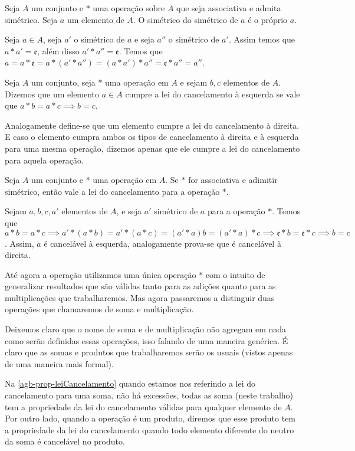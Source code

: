 \documentclass[../main.tex]{subfiles}
\begin{document}
\begin{prop}\label{agb-prop-simetricoSimetrico}
    Seja $A$ um conjunto e $*$ uma operação sobre $A$ que seja associativa e admita simétrico. Seja $a$ um elemento de $A$. O simétrico do simétrico de $a$ é o próprio $a$. 
\end{prop}
\begin{dem}
    Seja $a \in A$, seja $a'$ o simétrico de $a$ e seja $a''$ o simétrico de $a'$. Assim temos que $a * a' = \mathfrak{e}$, além disso $a' * a'' = \mathfrak{e}$.
    Temos que $a = a * \mathfrak{e} = a * (a' * a'') = (a * a') * a'' = \mathfrak{e} * a'' = a''$.
\end{dem}
\begin{defi}
    Seja $A$ um conjunto, seja $*$ uma operação em $A$ e sejam $b,c$ elementos de $A$. Dizemos que um elemento $a \in A$ cumpre a lei do cancelamento à esquerda se vale que $a*b=a*c \implies b=c$.
\end{defi}
    Analogamente define-se que um elemento cumpre a lei do cancelamento à direita. E caso o elemento cumpra ambos os tipos de cancelamento à direita e à esquerda para uma mesma operação, dizemos apenas que ele cumpre a lei do cancelamento para aquela operação.
\begin{prop}\label{agb-prop-leiCancelamento}
    Seja $A$ um conjunto e $*$ uma operação em $A$. Se $*$ for associativa e adimitir simétrico, então vale a lei do cancelamento para a operação $*$.
\end{prop}
\begin{dem}
    Sejam $a,b,c,a'$ elementos de $A$, e seja $a'$ simétrico de $a$ para a operação $*$. Temos que $a*b = a*c \implies a' * (a * b) = a' *(a*c) = (a' * a ) b = (a'*a)*c \implies \mathfrak{e} * b = \mathfrak{e} * c \implies b = c$. Assim, $a$ é cancelável à esquerda, analogamente prova-se que é cancelável à direita.
\end{dem}

Até agora a operação utilizamos uma única operação $*$ com o intuito de generalizar resultados que são válidas tanto para as adições quanto para as multiplicações que trabalharemos. Mas agora passaremos a distinguir duas operações que chamaremos de soma e multiplicação. 

Deixemos claro que o nome de soma e de multiplicação não agregam em nada como serão definidas essas operações, isso falando de uma maneira genérica. É claro que as somas e produtos que trabalharemos serão os usuais (vistos apenas de uma maneira mais formal).

{\textoIncluido
\begin{obs}
    Na \cref{agb-prop-leiCancelamento} quando estamos nos referindo a lei do cancelamento para uma soma, não há excessões, todas as soma (neste trabalho) tem a propriedade da lei do cancelamento válidas para qualquer elemento de $A$. Por outro lado, quando a operação é um produto, diremos que esse produto tem a propriedade da lei do cancelamento quando todo elemento diferente do neutro da soma é cancelável no produto.
\end{obs}
}
\end{document}
